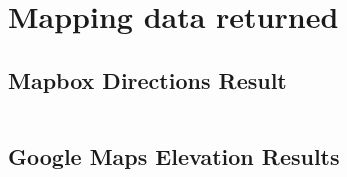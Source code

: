 \chapter{Mapping data returned} \label{appendix:mapDataReturned}

\section*{Mapbox Directions Result} \label{appSec:mapboxDirections}
\inputminted[frame=lines,framesep=2mm,baselinestretch=1.2,fontsize=\footnotesize]{json}{listings/mapbox-directions.json}

\section*{Google Maps Elevation Results} \label{appSec:googleElevation}
\inputminted[frame=lines,framesep=2mm,baselinestretch=1.2,fontsize=\footnotesize]{json}{listings/google-elevation.json}
